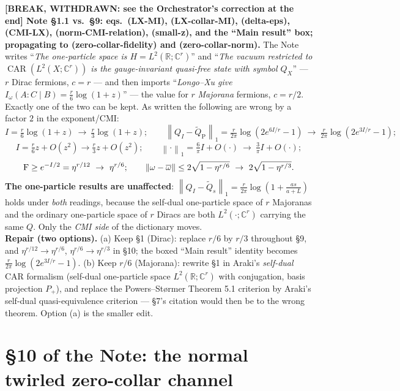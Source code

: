 \documentclass[11pt]{article}
\newcommand{\norm}[1]{\left\lVert #1\right\rVert}
\newcommand{\CAR}{\operatorname{CAR}}
\newcommand{\CMI}{I}
\begin{document}
\begin{verdictbreak}
\textbf{[BREAK, WITHDRAWN: see the Orchestrator's correction at the end] Note \S1.1 vs.\ \S9: eqs.~(LX-MI), (LX-collar-MI),
(delta-eps), (CMI-LX), (norm-CMI-relation), (small-z), and the ``Main result''
box; propagating to (zero-collar-fidelity) and (zero-collar-norm).}
The Note writes ``\emph{The one-particle space is $H=L^2(\mathbb R;\mathbb C^r)$}''
and ``\emph{The vacuum restricted to $\CAR(L^2(X;\mathbb C^r))$ is the
gauge-invariant quasi-free state with symbol $Q_X$}'' --- $r$ Dirac fermions,
$c=r$ --- and then imports ``\emph{Longo--Xu give
$\CMI_\omega(A:C\mid B)=\frac r6\log(1+z)$}'' --- the value for $r$
\emph{Majorana} fermions, $c=r/2$. Exactly one of the two can be kept. As
written the following are wrong by a factor $2$ in the exponent/CMI:
\[
 \CMI=\tfrac r6\log(1+z)\ \to\ \tfrac r3\log(1+z);\qquad
 \norm{Q_I-\widetilde Q_{\mathrm P}}_1=\tfrac r{2\pi}\log(2e^{6\CMI/r}-1)
 \ \to\ \tfrac r{2\pi}\log(2e^{3\CMI/r}-1);
\]
\[
 \CMI=\tfrac r6z+O(z^2)\to\tfrac r3z+O(z^2);\qquad
 \norm{\cdot}_1=\tfrac6\pi\CMI+O(\cdot)\ \to\ \tfrac3\pi\CMI+O(\cdot);
\]
\[
 \Fid\ge e^{-\CMI/2}=\eta^{r/12}\ \to\ \eta^{r/6};\qquad
 \norm{\omega-\overline\omega}\le2\sqrt{1-\eta^{r/6}}\ \to\ 2\sqrt{1-\eta^{r/3}} .
\]
\textbf{The one-particle results are unaffected}: $\norm{Q_I-\widetilde Q_s}_1
=\frac r{2\pi}\log(1+\frac{as}{a+L})$ holds under \emph{both} readings, because
the self-dual one-particle space of $r$ Majoranas and the ordinary one-particle
space of $r$ Diracs are both $L^2(\cdot;\mathbb C^r)$ carrying the same $Q$.
Only the \emph{CMI side} of the dictionary moves.\\
\textbf{Repair (two options).} (a) Keep \S1 (Dirac): replace $r/6$ by $r/3$
throughout \S9, and $\eta^{r/12}\to\eta^{r/6}$, $\eta^{r/6}\to\eta^{r/3}$ in
\S10; the boxed ``Main result'' identity becomes
$\frac r{2\pi}\log(2e^{3\CMI/r}-1)$. (b) Keep $r/6$ (Majorana): rewrite \S1 in
Araki's \emph{self-dual} CAR formalism (self-dual one-particle space
$L^2(\mathbb R;\mathbb C^r)$ with conjugation, basis projection $P_+$), and
replace the Powers--St\o rmer Theorem 5.1 criterion by Araki's self-dual
quasi-equivalence criterion --- \S7's citation would then be to the wrong
theorem. Option (a) is the smaller edit.
\end{verdictbreak}

\section{\S10 of the Note: the normal twirled zero-collar channel}\label{sec:ten}
\end{document}
